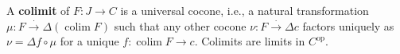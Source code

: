 A \textbf{colimit} of $F: J \rightarrow C$ is a universal cocone, i.e., a natural transformation $\mu: F \xrightarrow{\cdot} \Delta(\operatorname{colim} F)$ such that any other cocone $\nu: F \xrightarrow{\cdot} \Delta c$ factors uniquely as $\nu = \Delta f \circ \mu$ for a unique $f: \operatorname{colim} F \rightarrow c$. Colimits are limits in $C^{\text{op}}$.